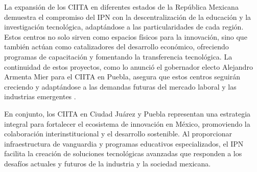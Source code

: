 La expansión de los CIITA en diferentes estados de la República Mexicana demuestra el compromiso del IPN con la descentralización de la educación y la investigación tecnológica, adaptándose a las particularidades de cada región. Estos centros no solo sirven como espacios físicos para la innovación, sino que también actúan como catalizadores del desarrollo económico, ofreciendo programas de capacitación y fomentando la transferencia tecnológica. La continuidad de estos proyectos, como lo anunció el gobernador electo Alejandro Armenta Mier para el CIITA en Puebla, asegura que estos centros seguirán creciendo y adaptándose a las demandas futuras del mercado laboral y las industrias emergentes \cite{diario_cambio_citta_puebla}.

En conjunto, los CIITA en Ciudad Juárez y Puebla representan una estrategia integral para fortalecer el ecosistema de innovación en México, promoviendo la colaboración interinstitucional y el desarrollo sostenible. Al proporcionar infraestructura de vanguardia y programas educativos especializados, el IPN facilita la creación de soluciones tecnológicas avanzadas que responden a los desafíos actuales y futuros de la industria y la sociedad mexicana.